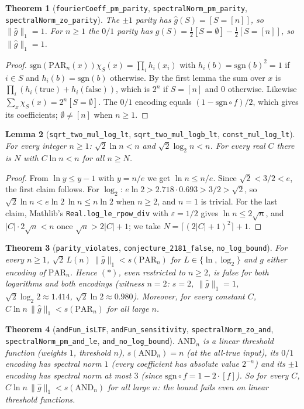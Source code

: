 \documentclass[11pt]{article}
\newtheorem{theorem}{Theorem}
\newtheorem{lemma}[theorem]{Lemma}
\theoremstyle{definition}
\begin{document}
\begin{theorem}[\texttt{fourierCoeff\_pm\_parity}, \texttt{spectralNorm\_pm\_parity},
\texttt{spectralNorm\_zo\_parity}]
The $\pm1$ parity has $\hat g(S)=[S=[n]]$, so $\|\hat g\|_1=1$. For $n\ge1$ the $0/1$ parity has
$\hat g(S)=\tfrac12[S=\emptyset]-\tfrac12[S=[n]]$, so $\|\hat g\|_1=1$.
\end{theorem}
\begin{proof}
$\mathrm{sgn}(\mathrm{PAR}_n(x))\chi_S(x)=\prod_i h_i(x_i)$ with
$h_i(b)=\mathrm{sgn}(b)^2=1$ if $i\in S$ and $h_i(b)=\mathrm{sgn}(b)$ otherwise. By the first lemma
the sum over $x$ is $\prod_i(h_i(\mathrm{true})+h_i(\mathrm{false}))$, which is $2^n$ if $S=[n]$
and $0$ otherwise. Likewise $\sum_x\chi_S(x)=2^n[S=\emptyset]$. The $0/1$ encoding equals
$(1-\mathrm{sgn}\circ f)/2$, which gives its coefficients; $\emptyset\ne[n]$ when $n\ge1$.
\end{proof}

\begin{lemma}[\texttt{sqrt\_two\_mul\_log\_lt}, \texttt{sqrt\_two\_mul\_logb\_lt}, \texttt{const\_mul\_log\_lt}]
For every integer $n\ge1$: $\sqrt2\ln n<n$ and $\sqrt2\log_2 n<n$. For every real $C$ there is $N$
with $C\ln n<n$ for all $n\ge N$.
\end{lemma}
\begin{proof}
From $\ln y\le y-1$ with $y=n/e$ we get $\ln n\le n/e$. Since $\sqrt2<3/2<e$, the first claim
follows. For $\log_2$: $e\ln2>2.718\cdot0.693>3/2>\sqrt2$, so $\sqrt2\ln n< e\ln 2\,\ln n\le n\ln2$
when $n\ge2$, and $n=1$ is trivial. For the last claim, Mathlib's \texttt{Real.log\_le\_rpow\_div}
with $\varepsilon=1/2$ gives $\ln n\le 2\sqrt n$, and $|C|\cdot2\sqrt n<n$ once
$\sqrt n>2|C|+1$; we take $N=\lceil(2|C|+1)^2\rceil+1$.
\end{proof}

\begin{theorem}[\texttt{parity\_violates}, \texttt{conjecture\_2181\_false}, \texttt{no\_log\_bound}]
For every $n\ge1$, $\sqrt2\,L(n)\,\|\hat g\|_1<s(\mathrm{PAR}_n)$ for $L\in\{\ln,\log_2\}$ and $g$
either encoding of $\mathrm{PAR}_n$. Hence $(\ast)$, even restricted to $n\ge2$, is false for both
logarithms and both encodings (witness $n=2$: $s=2$, $\|\hat g\|_1=1$,
$\sqrt2\log_2 2\approx1.414$, $\sqrt2\ln2\approx0.980$). Moreover, for every constant $C$,
$C\ln n\,\|\hat g\|_1<s(\mathrm{PAR}_n)$ for all large $n$.
\end{theorem}

\begin{theorem}[\texttt{andFun\_isLTF}, \texttt{andFun\_sensitivity}, \texttt{spectralNorm\_zo\_and},
\texttt{spectralNorm\_pm\_and\_le}, \texttt{and\_no\_log\_bound}]
$\mathrm{AND}_n$ is a linear threshold function (weights $1$, threshold $n$), $s(\mathrm{AND}_n)=n$
(at the all-true input), its $0/1$ encoding has spectral norm $1$ (every coefficient has
absolute value $2^{-n}$) and its $\pm1$ encoding has spectral norm at most $3$ (since
$\mathrm{sgn}\circ f=1-2\cdot[f]$). So for every $C$, $C\ln n\,\|\hat g\|_1<s(\mathrm{AND}_n)$ for
all large $n$: the bound fails even on linear threshold functions.
\end{theorem}
\end{document}
